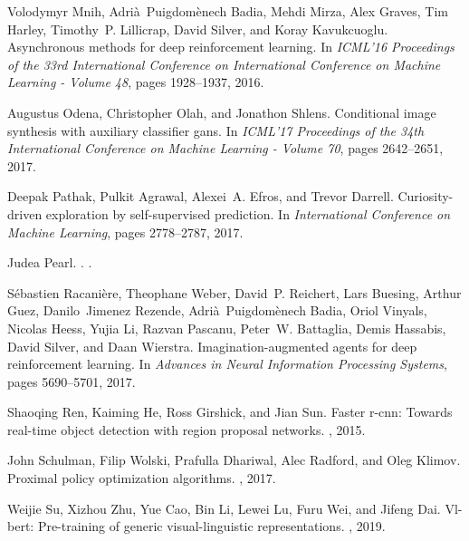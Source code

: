 \documentclass[10pt,twocolumn,letterpaper]{article}
\begin{document}
\begin{thebibliography}{10}
	Volodymyr {Mnih}, Adrià~Puigdomènech {Badia}, Mehdi {Mirza}, Alex {Graves},
	Tim {Harley}, Timothy~P. {Lillicrap}, David {Silver}, and Koray
	{Kavukcuoglu}.
	\newblock Asynchronous methods for deep reinforcement learning.
	\newblock In {\em ICML'16 Proceedings of the 33rd International Conference on
		International Conference on Machine Learning - Volume 48}, pages 1928--1937,
	2016.
	
	Augustus {Odena}, Christopher {Olah}, and Jonathon {Shlens}.
	\newblock Conditional image synthesis with auxiliary classifier gans.
	\newblock In {\em ICML'17 Proceedings of the 34th International Conference on
		Machine Learning - Volume 70}, pages 2642--2651, 2017.
	
	Deepak {Pathak}, Pulkit {Agrawal}, Alexei~A. {Efros}, and Trevor {Darrell}.
	\newblock Curiosity-driven exploration by self-supervised prediction.
	\newblock In {\em International Conference on Machine Learning}, pages
	2778--2787, 2017.
	
	Judea {Pearl}.
	.
	.
	
	Sébastien {Racanière}, Theophane {Weber}, David~P. {Reichert}, Lars
	{Buesing}, Arthur {Guez}, Danilo~Jimenez {Rezende}, Adrià~Puigdomènech
	{Badia}, Oriol {Vinyals}, Nicolas {Heess}, Yujia {Li}, Razvan {Pascanu},
	Peter~W. {Battaglia}, Demis {Hassabis}, David {Silver}, and Daan {Wierstra}.
	\newblock Imagination-augmented agents for deep reinforcement learning.
	\newblock In {\em Advances in Neural Information Processing Systems}, pages
	5690--5701, 2017.
	
	Shaoqing {Ren}, Kaiming {He}, Ross {Girshick}, and Jian {Sun}.
	\newblock Faster r-cnn: Towards real-time object detection with region proposal
	networks.
	, 2015.
	
	John {Schulman}, Filip {Wolski}, Prafulla {Dhariwal}, Alec {Radford}, and Oleg
	{Klimov}.
	\newblock Proximal policy optimization algorithms.
	, 2017.
	
	Weijie {Su}, Xizhou {Zhu}, Yue {Cao}, Bin {Li}, Lewei {Lu}, Furu {Wei}, and
	Jifeng {Dai}.
	\newblock Vl-bert: Pre-training of generic visual-linguistic representations.
	, 2019.
	

\end{thebibliography}
\end{document}
